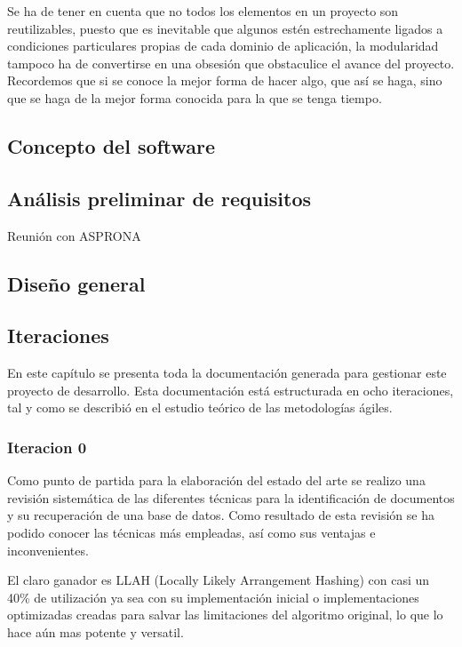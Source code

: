 \begin{itemize}
Se ha de tener en cuenta que no todos los elementos en un proyecto son reutilizables, puesto que es inevitable que algunos estén estrechamente ligados a condiciones particulares propias de cada dominio de aplicación, la modularidad tampoco ha de convertirse en una obsesión que obstaculice el avance del proyecto. Recordemos que si se conoce la mejor forma de hacer algo, que así se haga, sino que se haga de la mejor forma conocida para la que se tenga tiempo. 
\end{itemize}

  
\subsection{Concepto del software}
\subsection{Análisis preliminar de requisitos}
Reunión con ASPRONA


\subsection{Diseño general}
\subsection{Iteraciones}
En este capítulo se presenta toda la documentación generada para gestionar este proyecto de desarrollo. Esta documentación está estructurada en ocho iteraciones, tal y como se describió en el estudio teórico de las metodologías ágiles. 

\subsubsection{Iteracion 0}
Como punto de partida para la elaboración del estado del arte se realizo una revisión sistemática de las diferentes técnicas para la identificación de documentos y su recuperación de una base de datos. Como resultado de esta revisión se ha podido conocer las técnicas más empleadas, así como sus ventajas e inconvenientes. 

El claro ganador es LLAH (Locally Likely Arrangement Hashing) con casi un 40\% de utilización ya sea con su implementación inicial o implementaciones optimizadas creadas para salvar las limitaciones del algoritmo original, lo que lo hace aún mas potente y versatil.

